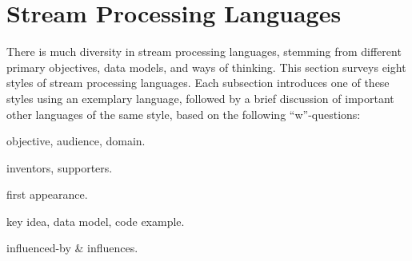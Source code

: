 \section{\hspace*{-2mm}Stream Processing Languages}\label{sec:languages}

There is much diversity in stream processing languages,
stemming from different primary objectives, data models, and ways of
thinking. This section surveys eight styles of stream processing languages.  Each
subsection introduces one of these styles using an exemplary language, followed by a
brief discussion of important other languages of the same style,
based on the following
``w''-questions:

\begin{description}[itemsep=0pt,topsep=2pt]
  \item[Why:] objective, audience, domain.
  \item[Who:] inventors, supporters.
  \item[When:] first appearance.
  \item[What:] key idea, data model, code example.
  \item[Whence \& whither:] influenced-by \& influences.
\end{description}










